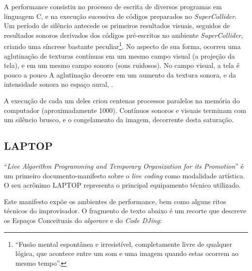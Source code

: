 A performance consistiu no processo de escrita de diversos programas em linguagem C, e na execução sucessiva de códigos preparados no \emph{SuperCollider}. Um período de silêncio antecede os primeiros resultados visuais, seguidos de resultados sonoros derivados dos códigos pré-escritos no ambiente \emph{SuperCollider}, criando uma síncrese bastante peculiar\footnote{``Fusão mental espontânea e irresistível, completamente livre de qualquer lógica, que acontece entre um som e uma imagem quando estas ocorrem ao mesmo tempo''.}. No aspecto de sua forma, ocorreu uma aglutinação de texturas contínuas em um mesmo campo visual (a projeção da tela), e em um mesmo campo sonoro (sons ruidosos). No campo visual, a tela é pouco a pouco  A aglutinação decorre em um aumento da textura sonora, e da intensidade sonora no espaço aural, .

A execução de cada um deles criou centenas processos paralelos na  memória do computador (aproximadamente 1000). Contínuos sonoros e visuais terminam com um silêncio brusco, e o congelamento da imagem, decorrente desta saturação.

\subsection{LAPTOP}\label{sec:laptoptoplap}

``\emph{Live Algorithm Programming and Temporary Organization for its Promotion}'' \cite{ward_live_2004,blackwell_programming_2005} é um primeiro documento-manifesto sobre o \emph{live coding} como modalidade artística. O seu acrônimo LAPTOP representa o principal equipamento técnico utilizado.

Este manifesto expõe os ambientes de performance, bem como alguns ritos técnicos do improvisador. O fragmento de texto abaixo é um recorte que descreve os Espaços Conceituais do \emph{algorave} e do \emph{Code DJing}:

